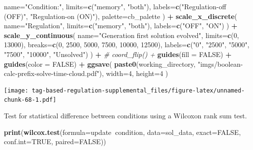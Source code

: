 \documentclass[]{book}
\newenvironment{Shaded}{\begin{snugshade}}{\end{snugshade}}
\newcommand{\CommentTok}[1]{\textcolor[rgb]{0.56,0.35,0.01}{\textit{#1}}}
\newcommand{\DataTypeTok}[1]{\textcolor[rgb]{0.13,0.29,0.53}{#1}}
\newcommand{\DecValTok}[1]{\textcolor[rgb]{0.00,0.00,0.81}{#1}}
\newcommand{\KeywordTok}[1]{\textcolor[rgb]{0.13,0.29,0.53}{\textbf{#1}}}
\newcommand{\NormalTok}[1]{#1}
\newcommand{\OperatorTok}[1]{\textcolor[rgb]{0.81,0.36,0.00}{\textbf{#1}}}
\newcommand{\OtherTok}[1]{\textcolor[rgb]{0.56,0.35,0.01}{#1}}
\newcommand{\StringTok}[1]{\textcolor[rgb]{0.31,0.60,0.02}{#1}}
\begin{document}
\begin{Shaded}
\begin{Highlighting}[]
    \DataTypeTok{name=}\StringTok{"Condition:"}\NormalTok{,}
    \DataTypeTok{limits=}\KeywordTok{c}\NormalTok{(}\StringTok{"memory"}\NormalTok{, }\StringTok{"both"}\NormalTok{),}
    \DataTypeTok{labels=}\KeywordTok{c}\NormalTok{(}\StringTok{"Regulation-off (OFF)"}\NormalTok{, }\StringTok{"Regulation-on (ON)"}\NormalTok{),}
    \DataTypeTok{palette=}\NormalTok{cb_palette}
\NormalTok{  ) }\OperatorTok{+}
\StringTok{  }\KeywordTok{scale_x_discrete}\NormalTok{(}
    \DataTypeTok{name=}\StringTok{"Regulation"}\NormalTok{,}
    \DataTypeTok{limits=}\KeywordTok{c}\NormalTok{(}\StringTok{"memory"}\NormalTok{, }\StringTok{"both"}\NormalTok{),}
    \DataTypeTok{labels=}\KeywordTok{c}\NormalTok{(}\StringTok{"OFF"}\NormalTok{, }\StringTok{"ON"}\NormalTok{)}
\NormalTok{  ) }\OperatorTok{+}
\StringTok{  }\KeywordTok{scale_y_continuous}\NormalTok{(}
    \DataTypeTok{name=}\StringTok{"Generation first solution evolved"}\NormalTok{,}
    \DataTypeTok{limits=}\KeywordTok{c}\NormalTok{(}\DecValTok{0}\NormalTok{, }\DecValTok{13000}\NormalTok{),}
    \DataTypeTok{breaks=}\KeywordTok{c}\NormalTok{(}\DecValTok{0}\NormalTok{, }\DecValTok{2500}\NormalTok{, }\DecValTok{5000}\NormalTok{, }\DecValTok{7500}\NormalTok{, }\DecValTok{10000}\NormalTok{, }\DecValTok{12500}\NormalTok{),}
    \DataTypeTok{labels=}\KeywordTok{c}\NormalTok{(}\StringTok{"0"}\NormalTok{, }\StringTok{"2500"}\NormalTok{, }\StringTok{"5000"}\NormalTok{, }\StringTok{"7500"}\NormalTok{, }\StringTok{"10000"}\NormalTok{, }\StringTok{"Unsolved"}\NormalTok{)}
\NormalTok{  ) }\OperatorTok{+}
\StringTok{  }\CommentTok{# coord_flip() +}
\StringTok{  }\KeywordTok{guides}\NormalTok{(}\DataTypeTok{fill =} \OtherTok{FALSE}\NormalTok{) }\OperatorTok{+}
\StringTok{  }\KeywordTok{guides}\NormalTok{(}\DataTypeTok{color =} \OtherTok{FALSE}\NormalTok{) }\OperatorTok{+}
\StringTok{  }\KeywordTok{ggsave}\NormalTok{(}
    \KeywordTok{paste0}\NormalTok{(working_directory, }\StringTok{"imgs/boolean-calc-prefix-solve-time-cloud.pdf"}\NormalTok{),}
    \DataTypeTok{width=}\DecValTok{4}\NormalTok{,}
    \DataTypeTok{height=}\DecValTok{4}
\NormalTok{  )}
\end{Highlighting}
\end{Shaded}

\texttt{[image: tag-based-regulation-supplemental\_files/figure-latex/unnamed-chunk-68-1.pdf]}

Test for statistical difference between conditions using a Wilcoxon rank sum test.

\begin{Shaded}
\begin{Highlighting}[]
\KeywordTok{print}\NormalTok{(}\KeywordTok{wilcox.test}\NormalTok{(}\DataTypeTok{formula=}\NormalTok{update}\OperatorTok{~}\NormalTok{condition, }\DataTypeTok{data=}\NormalTok{sol_data, }\DataTypeTok{exact=}\OtherTok{FALSE}\NormalTok{, }\DataTypeTok{conf.int=}\OtherTok{TRUE}\NormalTok{, }\DataTypeTok{paired=}\OtherTok{FALSE}\NormalTok{))}
\end{Highlighting}
\end{Shaded}
\end{document}
